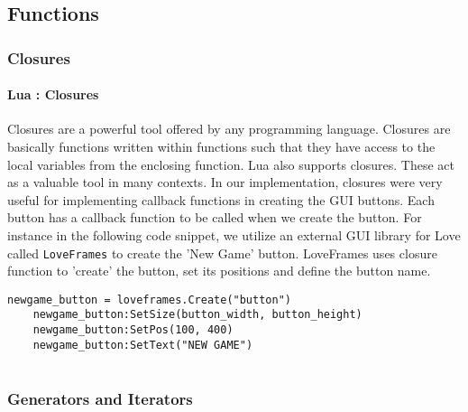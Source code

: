 
\subsection{Functions}
\label{functions}


\subsubsection{Closures}
\label{closures}

\paragraph{Lua : Closures}
Closures are a powerful tool offered by any programming language. Closures are basically functions written within functions such that they have access to the local variables from the enclosing function. Lua also supports closures. These act as a valuable tool in many contexts. In our implementation, closures were very useful for implementing callback functions in creating the GUI buttons. Each button has a callback function to be called when we create the button. For instance in the following code snippet, we utilize an external GUI library for Love called \texttt{LoveFrames} to create the 'New Game' button. LoveFrames uses closure function to 'create' the button, set its positions and define the button name.
\begin{lstlisting}[caption= Declaring and initializing metatables in Lua]
newgame_button = loveframes.Create("button")
    newgame_button:SetSize(button_width, button_height)
    newgame_button:SetPos(100, 400)
    newgame_button:SetText("NEW GAME")
    
\end{lstlisting}
    

\subsubsection{Generators and Iterators}

